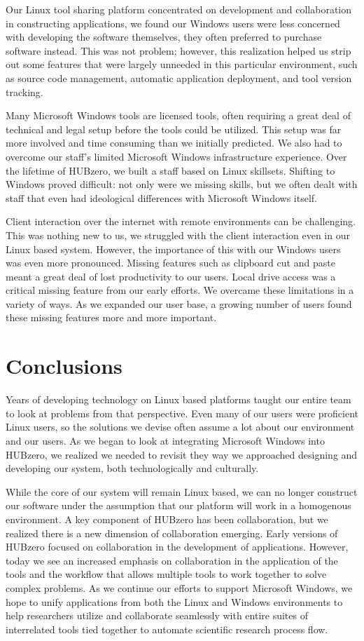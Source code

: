 \documentclass[conference]{../sty/IEEEtran}
\begin{document}
{Our Linux tool sharing platform concentrated on development and collaboration in constructing applications, we found our Windows users were less concerned with developing the software themselves, they often preferred to purchase software instead. This was not problem; however, this realization helped us strip out some features that were largely unneeded in this particular environment, such as source code management, automatic application deployment, and tool version tracking.

Many Microsoft Windows tools are licensed tools, often requiring a great deal of technical and legal setup before the tools could be utilized. This setup was far more involved and time consuming than we initially predicted. We also had to overcome our staff’s limited Microsoft Windows infrastructure experience. Over the lifetime of HUBzero, we built a staff based on Linux skillsets. Shifting to Windows proved difficult: not only were we missing skills, but we often dealt with staff that even had ideological differences with Microsoft Windows itself.

Client interaction over the internet with remote environments can be challenging. This was nothing new to us, we struggled with the client interaction even in our Linux based system. However, the importance of this with our Windows users was even more pronounced. Missing features such as clipboard cut and paste meant a great deal of lost productivity to our users. Local drive access was a critical missing feature from our early efforts. We overcame these limitations in a variety of ways. As we expanded our user base, a growing number of users found these missing features more and more important.


\section{Conclusions}

Years of developing technology on Linux based platforms taught our entire team to look at problems from that perspective. Even many of our users were proficient Linux users, so the solutions we devise often assume a lot about our environment and our users. As we began to look at integrating Microsoft Windows into HUBzero, we realized we needed to revisit they way we approached designing and developing our system, both technologically and culturally.

While the core of our system will remain Linux based, we can no longer construct our software under the assumption that our platform will work in a homogenous environment. A key component of HUBzero has been collaboration, but we realized there is a new dimension of collaboration emerging. Early versions of HUBzero focused on collaboration in the development of applications.  However, today we see an increased emphasis on collaboration in the application of the tools and the workflow that allows multiple tools to work together to solve complex problems. As we continue our efforts to support Microsoft Windows, we hope to unify applications from both the Linux and Windows environments to help researchers utilize and collaborate seamlessly with entire suites of interrelated tools tied together to automate scientific research process flow.


}
\end{document}
